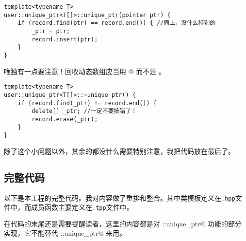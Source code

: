 \begin{lstlisting}
template<typename T>
user::unique_ptr<T[]>::unique_ptr(pointer ptr) {
    if (record.find(ptr) == record.end()) { //同上，没什么特别的
        _ptr = ptr;
        record.insert(ptr);
    }
}
\end{lstlisting}\par
唯独有一点要注意！回收动态数组应当用 \lstinline@delete[]@ 而不是 \lstinline@delete@。
\begin{lstlisting}
template<typename T>
user::unique_ptr<T[]>::~unique_ptr() {
    if (record.find(_ptr) != record.end()) {
        delete[] _ptr; //一定不要搞错了！
        record.erase(_ptr);
    }
}
\end{lstlisting}
除了这个小问题以外，其余的都没什么需要特别注意，我把代码放在最后了。\par
\subsection*{完整代码}
以下是本工程的完整代码。我对内容做了重排和整合。其中类模板定义在\texttt{.hpp}文件中，而成员函数主要定义在\texttt{.tpp}文件中。\par

\par
在代码的末尾还是需要提醒读者，这里的内容都是对 \lstinline@std::unique_ptr@ 功能的部分实现，它不能替代 \lstinline@std::unique_ptr@ 来用。